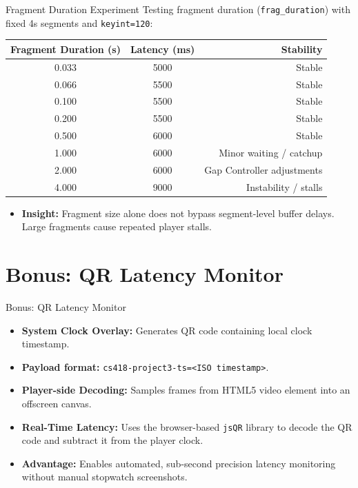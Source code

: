 \documentclass{beamer}
\begin{document}
\begin{frame}{Fragment Duration Experiment}
    Testing fragment duration (\texttt{frag\_duration}) with fixed 4s segments and \texttt{keyint=120}:
    \vspace{0.1cm}
    \begin{table}
        \centering
        \tiny
        \begin{tabular}{ccr}
            \toprule
            \textbf{Fragment Duration (s)} & \textbf{Latency (ms)} & \textbf{Stability} \\
            \midrule
            0.033 & 5000 & Stable \\
            0.066 & 5500 & Stable \\
            0.100 & 5500 & Stable \\
            0.200 & 5500 & Stable \\
            0.500 & 6000 & Stable \\
            1.000 & 6000 & Minor waiting / catchup \\
            2.000 & 6000 & Gap Controller adjustments \\
            4.000 & 9000 & Instability / stalls \\
            \bottomrule
        \end{tabular}
    \end{table}
    \vspace{-0.1cm}
    \begin{itemize}
        \item \textbf{Insight:} Fragment size alone does not bypass segment-level buffer delays. Large fragments cause repeated player stalls.
    \end{itemize}
\end{frame}

\section{Bonus: QR Latency Monitor}

\begin{frame}{Bonus: QR Latency Monitor}
    \begin{itemize}
        \item \textbf{System Clock Overlay:} Generates QR code containing local clock timestamp.
        \item \textbf{Payload format:} \texttt{cs418-project3-ts=<ISO timestamp>}.
        \item \textbf{Player-side Decoding:} Samples frames from HTML5 video element into an offscreen canvas.
        \item \textbf{Real-Time Latency:} Uses the browser-based \texttt{jsQR} library to decode the QR code and subtract it from the player clock.
        \item \textbf{Advantage:} Enables automated, sub-second precision latency monitoring without manual stopwatch screenshots.
    \end{itemize}
\end{frame}
\end{document}
